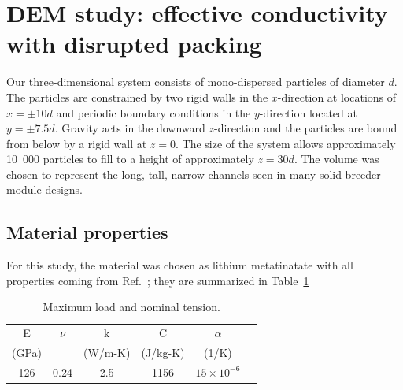 \section{DEM study: effective conductivity with disrupted packing}
\label{sec:dem-studies-effective-conductivity}


Our three-dimensional system consists of mono-dispersed particles of diameter $d$. The particles are constrained by two rigid walls in the $x$-direction at locations of $x = \pm 10d$  and periodic boundary conditions in the $y$-direction located at $y = \pm 7.5d$. Gravity acts in the downward $z$-direction and the particles are bound from below by a rigid wall at $z=0$. The size of the system allows approximately 10~000 particles to fill to a height of approximately $z = 30d$. The volume was chosen to represent the long, tall, narrow channels seen in many solid breeder module designs\cite{ Cho2008, Poitevin2010, Enoeda2003}.



\subsection{Material properties}
For this study, the material was chosen as lithium metatinatate with all properties coming from Ref.~\cite{Gierszewski1998}; they are summarized in Table~\ref{tab:matProps}

\begin {table}[tp] %
\caption{Maximum load and nominal tension.}
\label {tab:matProps} \centering %
\begin {tabular}{ cccccc }
\toprule %
E           &     $\nu$    	&    k         	&    C          &   $\alpha$                \\
(GPa)    	&            	& (W/m-K) 		&  (J/kg-K)  	&   (1/K)                   \\\toprule
126			&      0.24     &  2.5          &  1156       	&   $15\times10^{-6}$		\\\bottomrule
\end{tabular}
\end{table}




